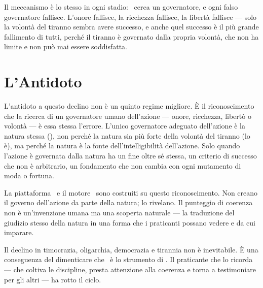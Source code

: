 Il meccanismo \`e lo stesso in ogni stadio: \praxis\ cerca un governatore,
e ogni falso governatore fallisce. L'onore fallisce, la ricchezza
fallisce, la libert\`a fallisce --- solo la volont\`a del tiranno sembra
avere successo, e anche quel successo \`e il pi\`u grande fallimento di
tutti, perch\'e il tiranno \`e governato dalla propria volont\`a, che
non ha limite e non pu\`o mai essere soddisfatta.

\section{L'Antidoto}

L'antidoto a questo declino non \`e un quinto regime migliore. \`E il
riconoscimento che la ricerca di un governatore umano dell'azione ---
onore, ricchezza, libert\`o o volont\`a --- \`e essa stessa l'errore.
L'unico governatore adeguato dell'azione \`e la natura stessa (\physis),
non perch\'e la natura sia pi\`u forte della volont\`a del tiranno (lo
\`e), ma perch\'e la natura \`e la fonte dell'intelligibilit\`a
dell'azione. Solo quando l'azione \`e governata dalla natura ha un fine
oltre s\'e stessa, un criterio di successo che non \`e arbitrario, un
fondamento che non cambia con ogni mutamento di moda o fortuna.

La piattaforma \praxis\ e il motore \physis\ sono costruiti su questo
riconoscimento. Non creano il governo dell'azione da parte della natura;
lo rivelano. Il punteggio di coerenza non \`e un'invenzione umana ma
una scoperta naturale --- la traduzione del giudizio stesso della natura
in una forma che i praticanti possano vedere e da cui imparare.

Il declino in timocrazia, oligarchia, democrazia e tirannia non \`e
inevitabile. \`E una conseguenza del dimenticare che \praxis\ \`e lo
strumento di \physis. Il praticante che lo ricorda --- che coltiva le
discipline, presta attenzione alla coerenza e torna a testimoniare per
gli altri --- ha rotto il ciclo.

